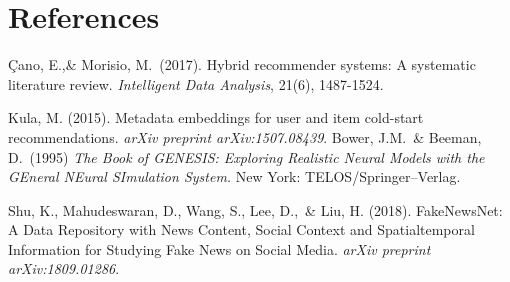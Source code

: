 \documentclass{article}
\begin{document}
\section*{References}

\begin{thebibliography}{9}

 Çano, E.,\& Morisio, M.\ (2017). Hybrid recommender systems: A systematic literature review. {\it Intelligent Data Analysis}, 21(6), 1487-1524.

 Kula, M. (2015). Metadata embeddings for user and item cold-start recommendations. {\it arXiv preprint arXiv:1507.08439}.
Bower, J.M.\ \& Beeman, D.\ (1995) {\it The Book of GENESIS: Exploring
  Realistic Neural Models with the GEneral NEural SImulation System.}  New York:
TELOS/Springer--Verlag.

 Shu, K., Mahudeswaran, D., Wang, S., Lee, D.,\ \& Liu, H. (2018). FakeNewsNet: A Data Repository with News Content, Social Context and Spatialtemporal Information for Studying Fake News on Social Media. {\it arXiv preprint arXiv:1809.01286}.

\end{thebibliography}
\end{document}
